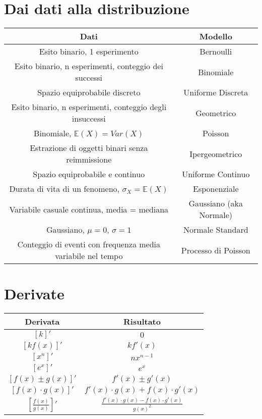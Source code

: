 \documentclass[11pt]{report}
\begin{document}
\section{Dai dati alla distribuzione}
\begin{center}
	\renewcommand{\arraystretch}{1.5}
    \begin{tabular}{|c|c|}
        \hline
        	\textbf{Dati} & \textbf{Modello}\\
        \hline
        	Esito binario, 1 esperimento & Bernoulli\\
        \hline
        	Esito binario, n esperimenti, conteggio dei successi & Binomiale\\
        \hline
        	Spazio equiprobabile discreto & Uniforme Discreta\\
        \hline
        	Esito binario, n esperimenti, conteggio degli insuccessi & Geometrico\\
        \hline
        	Binomiale, $\mathbb{E}(X) = Var(X)$ & Poisson\\
        \hline
        	Estrazione di oggetti binari senza reimmissione & Ipergeometrico\\
        \hline
        	Spazio equiprobabile e continuo & Uniforme Continuo\\
        \hline
        	Durata di vita di un fenomeno, $\sigma_X = \mathbb{E}(X)$ & Esponenziale\\
        \hline
        	Variabile casuale continua, media = mediana & Gaussiano (aka Normale)\\
        \hline
        	Gaussiano, $\mu = 0$, $\sigma = 1$ & Normale Standard\\
        \hline
        	Conteggio di eventi con frequenza media variabile nel tempo & Processo di Poisson\\
        \hline
    \end{tabular}
\end{center}
\section{Derivate}
\begin{center}
	\renewcommand{\arraystretch}{1.5}
    \begin{tabular}{|c|c|}
        \hline
        	\textbf{Derivata} & \textbf{Risultato}\\
        \hline
        	$[k]'$ & $0$\\
        \hline
        	$[kf(x)]'$ & $kf'(x)$\\
        \hline
        	$[x^n]'$ & $nx^{n-1}$\\
        \hline
        	$[e^x]'$ & $e^x$\\
        \hline
        	$[f(x) \pm g(x)]'$ & $f'(x) \pm g'(x)$\\
        \hline
        	$[f(x) \cdot g(x)]'$ & $f'(x) \cdot g(x) + f(x) \cdot g'(x)$\\
        \hline
        	$\left[ \frac{f(x)}{g(x)} \right]'$ & $\frac{f'(x) \cdot g(x) - f(x) \cdot g'(x)}{g(x)^2}$\\
        \hline
    \end{tabular}
\end{center}
\end{document}
